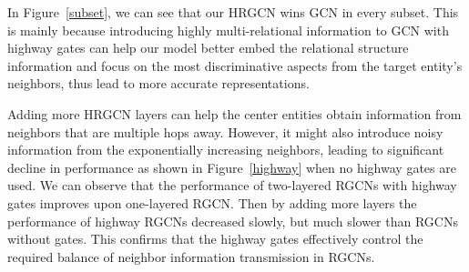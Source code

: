 	
	In Figure~\ref{subset}, we can see that our HRGCN wins GCN in every subset. 
	This is mainly because introducing highly multi-relational information to GCN with highway gates can help our model better embed the relational structure information and focus on the most discriminative aspects from the target entity's neighbors, thus lead to more accurate representations.
		
	

	Adding more HRGCN layers can help the center entities obtain information from neighbors that are multiple hops away. However, it might also introduce noisy information from the exponentially increasing neighbors, leading to significant decline in performance as shown in Figure~\ref{highway} when no highway gates are used. We can observe that the performance of two-layered RGCNs with highway gates improves upon one-layered RGCN. Then by adding more layers the performance of highway RGCNs decreased slowly, but much slower than RGCNs without gates. This confirms that the highway gates effectively control the required balance of neighbor information transmission in RGCNs.
	
